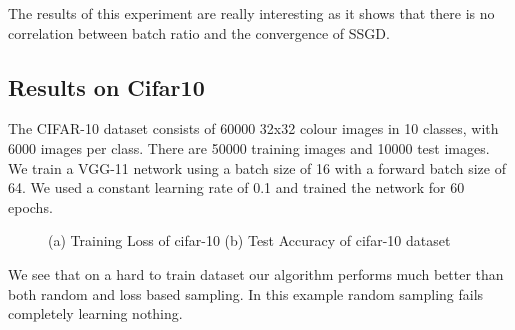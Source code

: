 \documentclass[a4paper,twoside]{iiththesis}
\theoremstyle{definition}
\theoremstyle{definition}
\theoremstyle{remark}
\begin{document}
The results of this experiment are really interesting as it shows that there is no correlation between batch ratio and the convergence of SSGD.
\newpage
\subsection{Results on Cifar10}
The CIFAR-10 dataset consists of 60000 32x32 colour images in 10 classes, with 6000 images per class. There are 50000 training images and 10000 test images. We train a VGG-11 network using a batch size of 16 with a forward batch size of 64. We used a constant learning rate of 0.1 and trained the network for 60 epochs.
\\
\begin{figure}
%
%
\caption{(a) Training Loss of cifar-10 (b) Test Accuracy of cifar-10 dataset}
\label{cifar-10}
\end{figure}
We see that on a hard to train dataset our algorithm performs much better than both random and loss based sampling. In this example random sampling fails completely learning nothing.
\end{document}
